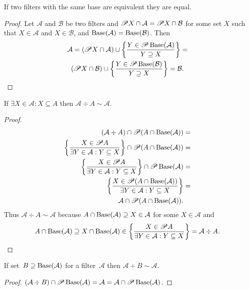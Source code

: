 \begin{prop}
If two filters with the same base are equivalent they are equal.\end{prop}
\begin{proof}
Let $\mathcal{A}$ and $\mathcal{B}$ be two filters and $\mathscr{P} X\cap\mathcal{A}=\mathscr{P} X\cap\mathcal{B}$
for some set $X$ such that $X\in\mathcal{A}$ and $X\in\mathcal{B}$,
and $\operatorname{Base}(\mathcal{A})=\operatorname{Base}(\mathcal{B})$. Then
\begin{multline*}
\mathcal{A}=(\mathscr{P} X\cap\mathcal{A})\cup\left\{ \frac{Y\in\mathscr{P}\operatorname{Base}(\mathcal{A})}{Y\supseteq X}\right\}=\\
(\mathscr{P} X\cap\mathcal{B})\cup\left\{ \frac{Y\in\mathscr{P}\operatorname{Base}(\mathcal{B})}{Y\supseteq X}\right\}=\mathcal{B}.
\end{multline*}
\end{proof}

\begin{prop}\label{filteq-ext}
If $\exists X\in\mathcal{A}:X\subseteq A$ then $\mathcal{A}\div A\sim\mathcal{A}$.
\end{prop}
\begin{proof}
~
\begin{align*}
(\mathcal{A}\div A)\cap\mathscr{P}(A\cap\operatorname{Base}(\mathcal{A})) & =\\
\left\{ \frac{X\in\mathscr{P} A}{\exists Y\in\mathcal{A}:Y\subseteq X}\right\}\cap\mathscr{P}(A\cap\operatorname{Base}(\mathcal{A})) & =\\
\left\{ \frac{X\in\mathscr{P} A}{\exists Y\in\mathcal{A}:Y\subseteq X}\right\}\cap\mathscr{P}\operatorname{Base}(\mathcal{A}) & =\\
\left\{ \frac{X\in\mathscr{P}(A\cap\operatorname{Base}(\mathcal{A}))}{\exists Y\in\mathcal{A}:Y\subseteq X}\right\} & =\\
\mathcal{A}\cap\mathscr{P}(A\cap\operatorname{Base}(\mathcal{A})).
\end{align*}
Thus $\mathcal{A}\div A\sim\mathcal{A}$ because $A\cap\operatorname{Base}(\mathcal{A})\supseteq X\in\mathcal{A}$
for some $X\in\mathcal{A}$ and 
\[
A\cap\operatorname{Base}(\mathcal{A})\supseteq X\cap\operatorname{Base}(\mathcal{A})\in\left\{ \frac{X\in\mathscr{P} A}{\exists Y\in\mathcal{A}:Y\subseteq X}\right\}=\mathcal{A}\div A.
\]
\end{proof}

\begin{prop}
If set~$B\supseteq\operatorname{Base}(\mathcal{A})$ for a
filter~$\mathcal{A}$ then
$\mathcal{A}\div B\sim\mathcal{A}$.
\end{prop}

\begin{proof}
$(\mathcal{A}\div B)\cap\mathscr{P}\operatorname{Base}(\mathcal{A}) = 
\mathcal{A} =\mathcal{A}\cap\mathscr{P}\operatorname{Base}(\mathcal{A})$.
\end{proof}


